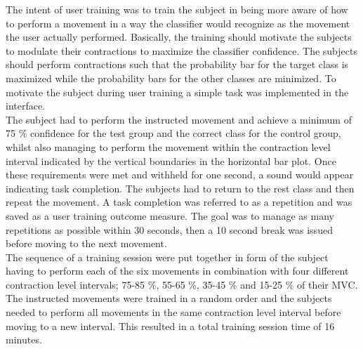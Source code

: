 

The intent of user training was to train the subject in being more aware of how to perform a movement in a way the classifier would recognize as the movement the user actually performed. Basically, the training should motivate the subjects to modulate their contractions to maximize the classifier confidence. The subjects should perform contractions such that the probability bar for the target class is maximized while the probability bars for the other classes are minimized. To motivate the subject during user training a simple task was implemented in the interface. \\
The subject had to perform the instructed movement and achieve a minimum of 75 \% confidence for the test group and the correct class for the control group, whilst also managing to perform the movement within the contraction level interval indicated by the vertical boundaries in the horizontal bar plot. Once these requirements were met and withheld for one second, a sound would appear indicating task completion. The subjects had to return to the rest class and then repeat the movement. A task completion was referred to as a repetition and was saved as a user training outcome measure. The goal was to manage as many repetitions as possible within 30 seconds, then a 10 second break was issued before moving to the next movement. \\
The sequence of a training session were put together in form of the subject having to perform each of the six movements in combination with four different contraction level intervals; 75-85 \%, 55-65 \%, 35-45 \% and 15-25 \% of their MVC. The instructed movements were trained in a random order and the subjects needed to perform all movements in the same contraction level interval before moving to a new interval. This resulted in a total training session time of 16 minutes.  

     


